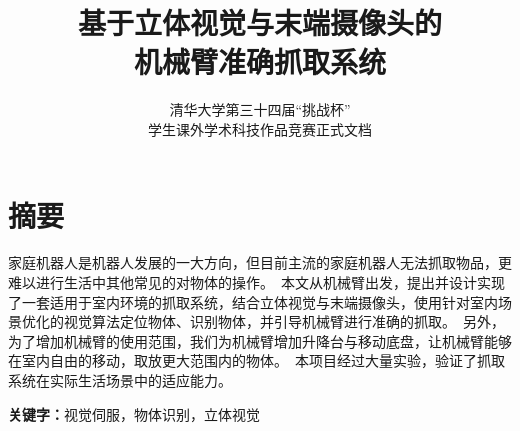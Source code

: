 \documentclass[a4paper, 12pt, titlepage]{article}
\begin{document}
\setlength{\parindent}{2em}

\title{基于立体视觉与末端摄像头的\\机械臂准确抓取系统}
\author{清华大学第三十四届“挑战杯”\\学生课外学术科技作品竞赛正式文档}
\date{}
\maketitle

\section*{摘要}

家庭机器人是机器人发展的一大方向，但目前主流的家庭机器人无法抓取物品，更难以进行生活中其他常见的对物体的操作。\ 本文从机械臂出发，提出并设计实现了一套适用于室内环境的抓取系统，结合立体视觉与末端摄像头，使用针对室内场景优化的视觉算法定位物体、识别物体，并引导机械臂进行准确的抓取。\ 另外，为了增加机械臂的使用范围，我们为机械臂增加升降台与移动底盘，让机械臂能够在室内自由的移动，取放更大范围内的物体。\ 本项目经过大量实验，验证了抓取系统在实际生活场景中的适应能力。

\textbf{关键字：}视觉伺服，物体识别，立体视觉

\newpage

\tableofcontents









\end{document}
